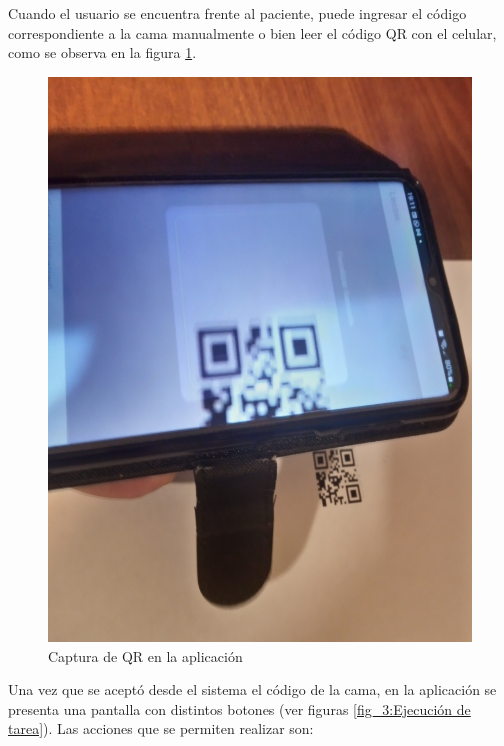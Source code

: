 Cuando el usuario se encuentra frente al paciente, puede ingresar el código correspondiente a la cama manualmente o bien leer el código QR con el celular, como se observa en la figura \ref{fig: Captura de QR en la aplicación.}.

\begin{figure}[ht]
	\centering
	\includegraphics[scale=.05]{./Figures/app/capturaQR.jpg}
	\caption{ Captura de QR en la aplicación}
	\label{fig: Captura de QR en la aplicación.}
\end{figure} 


Una vez que se aceptó desde el sistema el código de la cama, en la aplicación se presenta una pantalla con distintos botones (ver figuras \ref{fig_3:Ejecución de tarea}). Las acciones que se permiten realizar son:


